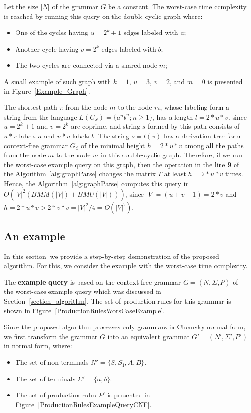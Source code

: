Let the size $|N|$ of the grammar $G$ be a constant. The worst-case time complexity is reached by running this query on the double-cyclic graph where:
\begin{itemize}
	\item One of the cycles having $u = 2^k + 1$ edges labeled with $a$;
	\item Another cycle having $v = 2^k$ edges labeled with $b$;
	\item The two cycles are connected via a shared node $m$;
\end{itemize}

A small example of such graph with $k = 1$, $u = 3$, $v = 2$, and $m = 0$ is presented in Figure~\ref{Example_Graph}.

The shortest path $\pi$ from the node $m$ to the node $m$, whose labeling form a string from the language $L(G_S)=\{a^n b^n; n \geq 1\}$, has a length $l = 2*u*v$, since $u = 2^k + 1$ and $v = 2^k$ are coprime, and string $s$ formed by this path consists of $u*v$ labels $a$ and $u*v$ labels $b$. The string $s = l(\pi)$ has a derivation tree for a context-free grammar $G_S$ of the minimal height $h = 2*u*v$ among all the paths from the node $m$ to the node $m$ in this double-cyclic graph. Therefore, if we run the worst-case example query on this graph, then the operation in the line \textbf{9} of the Algorithm~\ref{alg:graphParse} changes the matrix $T$ at least $h = 2*u*v$ times. Hence, the Algorithm~\ref{alg:graphParse} computes this query in $O(|V|^2(BMM(|V|) + BMU(|V|)))$, since $|V| = (u + v - 1) = 2*v$ and $h = 2*u*v > 2*v*v = |V|^2 / 4 = O(|V|^2)$.

\subsection{An example} \label{section_example}
In this section, we provide a step-by-step demonstration of the proposed algorithm. For this, we consider the example with the worst-case time complexity.

The \textbf{example query} is based on the context-free grammar $G = (N, \Sigma, P)$ of the worst-case example query which was discussed in Section~\ref{section_algorithm}. The set of production rules for this grammar is shown in Figure~\ref{ProductionRulesWorsCaseExample}.

Since the proposed algorithm processes only grammars in Chomsky normal form, we first transform the grammar $G$ into an equivalent grammar $G' = (N', \Sigma', P')$ in normal form, where:
\begin{itemize}
    \item The set of non-terminals $N' = \{S, S_1, A, B\}$.
    \item The set of terminals $\Sigma' = \{a, b\}.$
    \item The set of production rules $P'$ is presented in Figure~\ref{ProductionRulesExampleQueryCNF}.
\end{itemize}

